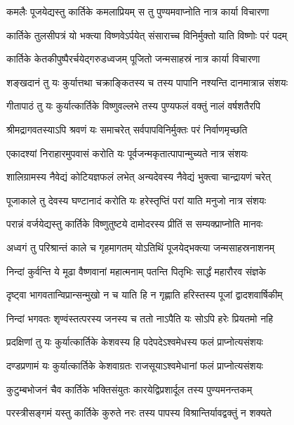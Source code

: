 \twolineshloka
{कमलैः पूजयेद्यस्तु कार्तिके कमलाप्रियम्}
{स तु पुण्यमवाप्नोति नात्र कार्या विचारणा} %

\twolineshloka
{कार्तिके तुलसीपत्रं यो भक्त्या विष्णवेऽर्पयेत्}
{संसाराच्च विनिर्मुक्तो याति विष्णोः परं पदम्} %

\twolineshloka
{कार्तिके केतकीपुष्पैरर्चयेद्गरुडध्वजम्}
{पूजितो जन्मसाहस्रं नात्र कार्या विचारणा} %

\twolineshloka
{शङ्खदानं तु यः कुर्यात्तथा चक्राङ्कितस्य च}
{तस्य पापानि नश्यन्ति दानमात्रान्न संशयः} %

\twolineshloka
{गीतापाठं तु यः कुर्यात्कार्तिके विष्णुवल्लभे}
{तस्य पुण्यफलं वक्तुं नालं वर्षशतैरपि} %

\twolineshloka
{श्रीमद्रागवतस्याऽपि श्रवणं यः समाचरेत्}
{सर्वपापविनिर्मुक्तः परं निर्वाणमृच्छति} %

\twolineshloka
{एकादश्यां निराहारमुपवासं करोति यः}
{पूर्वजन्मकृतात्पापान्मुच्यते नात्र संशयः} %

\twolineshloka
{शालिग्रामस्य नैवेद्यं कोटियज्ञफलं लभेत्}
{अन्यदेवस्य नैवेद्यं भुक्त्वा चान्द्रायणं चरेत्} %

\twolineshloka
{पूजाकाले तु देवस्य घण्टानादं करोति यः}
{हरेस्तृप्तिं परां याति मनुजो नात्र संशयः} %

\twolineshloka
{परान्नं वर्जयेद्यस्तु कार्तिके विष्णुतुष्टये}
{दामोदरस्य प्रीतिं स सम्यक्प्राप्नोति मानवः} %

\twolineshloka
{अध्वगं तु परिश्रान्तं काले च गृहमागतम्}
{योऽतिथिं पूजयेद्भक्त्या जन्मसाहस्रनाशनम्} %

\twolineshloka
{निन्दां कुर्वन्ति ये मूढा वैष्णवानां महात्मनाम्}
{पतन्ति पितृभिः सार्द्धं महारौरव संज्ञके} %

\twolineshloka
{दृष्ट्वा भागवतान्विप्रान्सन्मुखो न च याति हि}
{न गृह्णाति हरिस्तस्य पूजां द्वादशवार्षिकीम्} %

\twolineshloka
{निन्दां भगवतः शृण्वंस्तत्परस्य जनस्य च}
{ततो नाऽपैति यः सोऽपि हरेः प्रियतमो नहि} %

\twolineshloka
{प्रदक्षिणां तु यः कुर्यात्कार्तिके केशवस्य हि}
{पदेपदेऽश्वमेधस्य फलं प्राप्नोत्यसंशयः} %

\twolineshloka
{दण्डप्रणामं यः कुर्यात्कार्तिके केशवाग्रतः}
{राजसूयाऽश्वमेधानां फलं प्राप्नोत्यसंशयः} %

\twolineshloka
{कुटुम्बभोजनं चैव कार्तिके भक्तिसंयुतः}
{कारयेद्विप्रशार्दूल तस्य पुण्यमनन्तकम्} %

\twolineshloka
{परस्त्रीसङ्गमं यस्तु कार्तिके कुरुते नरः}
{तस्य पापस्य विश्रान्तिर्यावद्वक्तुं न शक्यते} %

